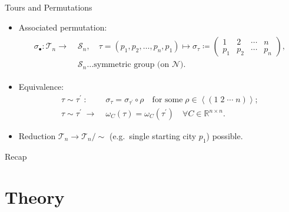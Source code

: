 \documentclass[
  size=8pt,
  style=klope,
  paper=screen,
  pauseslide,
  nopagebreaks,
  hlsections,
  fleqn
]{powerdot}
\def\eqitspace{\vspace{-5mm}}
\begin{document}
\begin{slide}{Tours and Permutations}
\begin{itemize}
  \item
  Associated permutation:
  \begin{align}
  \begin{split}
    \sigma_\bullet :
    \mathcal{T}_n \to \; & \mathcal{S}_n, \quad
    \tau = \left(p_1, p_2, \ldots, p_n, p_1 \right)
    \mapsto
  \sigma_\tau \coloneqq
  \begin{pmatrix}
    1 & 2 & \cdots & n \\
    p_1 & p_2 & \cdots &  p_n
  \end{pmatrix},
  \\
  & \mathcal{S}_n \ldots \text{symmetric group (on }\mathcal{N} \text{)}.
  \end{split}
  \end{align}
\eqitspace%
\item
  Equivalence:
  \begin{align}
    \tau \sim \tau^\prime
    \;:\;
    &
    \sigma_\tau = \sigma_{\tau^\prime} \circ \rho
    \quad \text{for some}\; \rho \in \left<\left(1 \; 2 \; \cdots \; n \right)\right>;
    \\
    \tau \sim \tau^\prime
    \;\rightarrow\;
    &
    \omega_C\left(\tau\right) = \omega_C\left(\tau^\prime\right)
    \quad \forall C \in \mathbb{R}^{n \times n}.
  \end{align}
  \eqitspace%
  \item
  Reduction $\mathcal{T}_n \to \mathcal{T}_n/{\sim}$ (e.g.\ single starting city $p_1$) possible.
\end{itemize}
\end{slide}

\begin{slide}[toc=,bm=]{Recap}
\tableofcontents[content=currentsection,type=1]
\end{slide}

\section[template=wideslide]{Theory}
\end{document}
